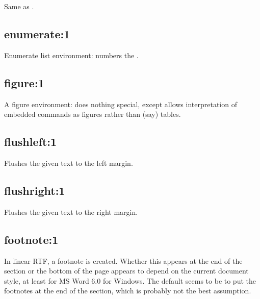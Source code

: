 Same as .

\subsection*{enumerate:1}\label{enumerate}

Enumerate list environment: numbers the .


\subsection*{figure:1}\label{figure}

A figure environment: does nothing special, except allows interpretation of
embedded  commands as figures rather than (say) tables.

\subsection*{flushleft:1}\label{flushleft}

Flushes the given text to the left margin.

\subsection*{flushright:1}\label{flushright}

Flushes the given text to the right margin.

\subsection*{footnote:1}\label{footnote}

In linear RTF, a footnote is created. Whether this appears at the end of
the section or the bottom of the page appears to depend on the current
document style, at least for MS Word 6.0 for Windows. The default seems
to be to put the footnotes at the end of the section, which is probably
not the best assumption.

